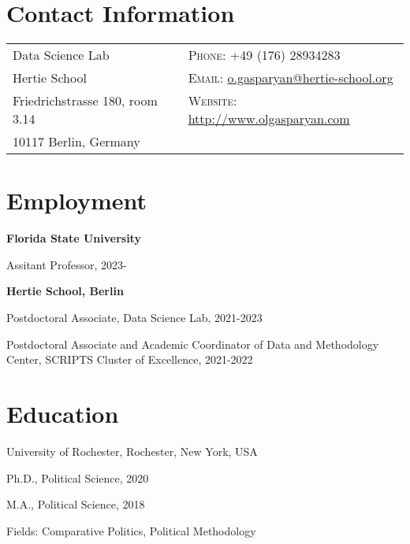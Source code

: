 \documentclass[margin,line,10.95pt]{res}
\newenvironment{list1}{
  \begin{list}{\ding{113}}{%
      \setlength{\itemsep}{0in}
      \setlength{\parsep}{0in} \setlength{\parskip}{0in}
      \setlength{\topsep}{0in} \setlength{\partopsep}{0in}
      \setlength{\leftmargin}{0.17in}}}{\end{list}}
\begin{document}

\begin{resume}
\section{\sc Contact Information}
\vspace{.05in}
\begin{tabular}{@{}p{2.5in}p{4in}}
Data Science Lab                 & \textsc{Phone}: +49 (176) 28934283 \\
  Hertie School  & \textsc{Email}: \href{mailto:o.gasparyan@hertie-school.org}{o.gasparyan@hertie-school.org} \\
Friedrichstrasse 180, room 3.14              & \textsc{Website}: \href{http://www.olgasparyan.com}{http://www.olgasparyan.com} \\
10117 Berlin, Germany        \\
\end{tabular}

\section{\sc Employment}
{\textbf{Florida State University}}\\
\vspace*{-.1in}
\begin{list1}
	\item[] Assitant Professor, 2023-

\end{list1}


\textbf{Hertie School, Berlin}\\
\vspace*{-.1in}
\begin{list1}
	\item[] Postdoctoral Associate, Data Science Lab, 2021-2023
	\item[] Postdoctoral Associate and Academic Coordinator of Data and Methodology Center, SCRIPTS Cluster of Excellence, 2021-2022

\end{list1}

\section{\sc Education}
{University of Rochester}, Rochester, New York, USA\\
\vspace*{-.1in}
\begin{list1}
\item[] Ph.D., Political Science, 2020 
\item[] M.A., Political Science, 2018 
\item[] Fields: Comparative Politics, Political Methodology 
\end{list1}


\end{resume}
\end{document}
